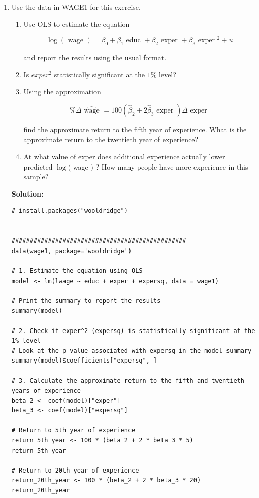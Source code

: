 \documentclass[12pt]{article}
\begin{document}
\begin{enumerate}
    \item Use the data in WAGE1 for this exercise.
    
\begin{enumerate}
    \item Use OLS to estimate the equation

$$
\log (\text { wage })=\beta_0+\beta_1 \text { educ }+\beta_2 \text { exper }+\beta_3 \text { exper }^2+u
$$

and report the results using the usual format.
\item Is  ${exper}^2$ statistically significant at the $1 \%$ level?
\item Using the approximation

$$
\% \Delta \widehat{\text { wage }}=100\left(\hat{\beta}_2+2 \hat{\beta}_3 \text { exper }\right) \Delta \text { exper }
$$

find the approximate return to the fifth year of experience. What is the approximate return to the twentieth year of experience?
\item At what value of exper does additional experience actually lower predicted $\log ($ wage $)$ ? How many people have more experience in this sample?


\end{enumerate}


{\color{blue}
\noindent \textbf{Solution:}

\begin{verbatim}
# install.packages("wooldridge")


################################################
data(wage1, package='wooldridge')

# 1. Estimate the equation using OLS
model <- lm(lwage ~ educ + exper + expersq, data = wage1)

# Print the summary to report the results
summary(model)

# 2. Check if exper^2 (expersq) is statistically significant at the 1% level
# Look at the p-value associated with expersq in the model summary
summary(model)$coefficients["expersq", ]

# 3. Calculate the approximate return to the fifth and twentieth years of experience
beta_2 <- coef(model)["exper"]
beta_3 <- coef(model)["expersq"]

# Return to 5th year of experience
return_5th_year <- 100 * (beta_2 + 2 * beta_3 * 5)
return_5th_year

# Return to 20th year of experience
return_20th_year <- 100 * (beta_2 + 2 * beta_3 * 20)
return_20th_year


\end{verbatim}}
\end{enumerate}
\end{document}
